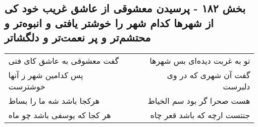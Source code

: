 \begin{center}
\section*{بخش ۱۸۲ - پرسیدن معشوقی از عاشق غریب خود کی از شهرها کدام شهر را خوشتر یافتی و انبوه‌تر و محتشم‌تر و پر نعمت‌تر و دلگشاتر}
\label{sec:sh182}
\begin{longtable}{l p{0.5cm} r}
گفت معشوقی به عاشق کای فتی
&&
تو به غربت دیده‌ای بس شهرها
\\
پس کدامین شهر ز آنها خوشترست
&&
گفت آن شهری که در وی دلبرست
\\
هرکجا باشد شه ما را بساط
&&
هست صحرا گر بود سم الخیاط
\\
هر کجا که یوسفی باشد چو ماه
&&
جنتست ارچه که باشد قعر چاه
\\
\end{longtable}
\end{center}
